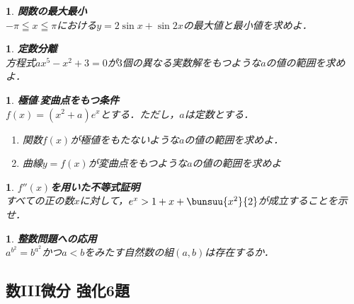 \documentclass[10pt,
fleqn,
dvipdfmx,
uplatex
]{jsarticle}
\newtheorem{question}[Question]{}
\begin{document}
\begin{question}{\bf\boldmath 関数の最大最小}\\
$-\pi \leqq x\leqq \pi$における$y=2\sin x+\sin 2x$の最大値と最小値を求めよ．
\end{question}



\begin{question}{\bf\boldmath 定数分離}\\
方程式$ax^5-x^2+3=0$が$3$個の異なる実数解をもつような$a$の値の範囲を求めよ．
\end{question}



\begin{question}{\bf\boldmath 極値$\cdot$変曲点をもつ条件}\\
$f\left(x\right)=\left(x^2+a\right)e^x$とする．ただし，$a$は定数とする．
\begin{enumerate}
\item 関数$f\left(x\right)$が極値をもたないような$a$の値の範囲を求めよ．
\item 曲線$y=f\left(x\right)$が変曲点をもつような$a$の値の範囲を求めよ
\end{enumerate}

\end{question}



\begin{question}{\bf\boldmath $f''\left(x\right)$を用いた不等式証明}\\
すべての正の数$x$に対して，$e^x>1+x+\bunsuu{{x^2}}{2}$が成立することを示せ．
\end{question}



\begin{question}{\bf\boldmath 整数問題への応用}\\
$a^{b^2}=b^{a^2}$かつ$a<b$をみたす自然数の組$\left(a,b\right)$は存在するか．
\end{question}

\subsection{数III微分 強化6題}
\end{document}
